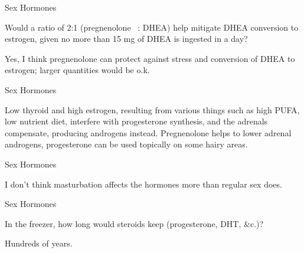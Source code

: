 \documentclass[11pt,oneside,openany,extrafontsizes]{memoir}
\begin{document}
\begin{qaexchange}{Sex Hormones}

    \begin{question}
        Would a ratio of 2:1 (pregnenolone  : DHEA) help mitigate DHEA conversion to estrogen, given no more than 15 mg of DHEA is ingested in a day?
    \end{question}

    \begin{answer}
        Yes, I think pregnenolone can protect against stress and conversion of DHEA to estrogen; larger quantities would be o.k.
    \end{answer}
\end{qaexchange}

\begin{standalonequote}{Sex Hormones}

    \begin{answer}
        Low thyroid and high estrogen, resulting from various things such as high PUFA, low nutrient diet, interfere with progesterone synthesis, and the adrenals compensate, producing androgens instead. Pregnenolone helps to lower adrenal androgens, progesterone can be used topically on some hairy areas.
    \end{answer}
\end{standalonequote}

\begin{standalonequote}{Sex Hormones}

    \begin{answer}
      I don't think masturbation affects the hormones more than regular sex does.
    \end{answer}
\end{standalonequote}

\begin{qaexchange}{Sex Hormones}

    \begin{question}
        In the freezer, how long would steroids keep (progesterone, DHT, \&c.)?
    \end{question}

    \begin{answer}
      Hundreds of years.
    \end{answer}
\end{qaexchange}
\end{document}

